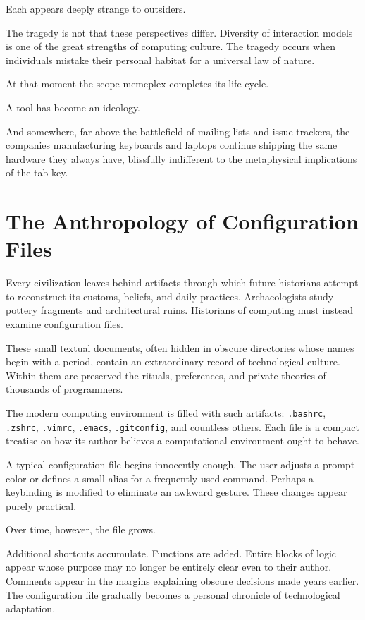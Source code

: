 \documentclass[11pt]{article}
\theoremstyle{definition}
\begin{document}
Each appears deeply strange to outsiders.

The tragedy is not that these perspectives differ. Diversity of
interaction models is one of the great strengths of computing culture.
The tragedy occurs when individuals mistake their personal habitat for
a universal law of nature.

At that moment the scope memeplex completes its life cycle.

A tool has become an ideology.

And somewhere, far above the battlefield of mailing lists and issue
trackers, the companies manufacturing keyboards and laptops continue
shipping the same hardware they always have, blissfully indifferent to
the metaphysical implications of the tab key.

\section{The Anthropology of Configuration Files}

Every civilization leaves behind artifacts through which future
historians attempt to reconstruct its customs, beliefs, and daily
practices. Archaeologists study pottery fragments and architectural
ruins. Historians of computing must instead examine configuration
files.

These small textual documents, often hidden in obscure directories
whose names begin with a period, contain an extraordinary record of
technological culture. Within them are preserved the rituals,
preferences, and private theories of thousands of programmers.

The modern computing environment is filled with such artifacts:
\texttt{.bashrc}, \texttt{.zshrc}, \texttt{.vimrc}, \texttt{.emacs},
\texttt{.gitconfig}, and countless others. Each file is a compact
treatise on how its author believes a computational environment ought
to behave.

A typical configuration file begins innocently enough. The user
adjusts a prompt color or defines a small alias for a frequently used
command. Perhaps a keybinding is modified to eliminate an awkward
gesture. These changes appear purely practical.

Over time, however, the file grows.

Additional shortcuts accumulate. Functions are added. Entire blocks of
logic appear whose purpose may no longer be entirely clear even to
their author. Comments appear in the margins explaining obscure
decisions made years earlier. The configuration file gradually becomes
a personal chronicle of technological adaptation.
\end{document}
